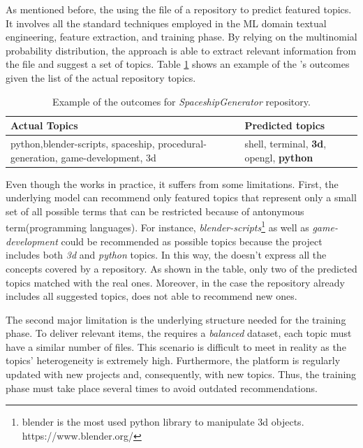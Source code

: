 As mentioned before, the \MNB using the \RM file of a repository to predict featured topics. It involves all the standard techniques employed in the ML domain \ie textual engineering, feature extraction, and training phase. By relying on the multinomial probability distribution, the approach is able to extract relevant information from the \RM file and suggest a set of topics. Table \ref{tab:example} shows an example of the \MNB's outcomes given the list of the actual repository topics. 

\begin{table}[h]
\centering

\resizebox{8.5cm}{!} {

\begin{tabular}{| p{3.2cm} | p{3.2cm} | }
\hline
 \textbf{Actual Topics} &\textbf{ Predicted topics} \\ \hline
     python,blender-scripts, spaceship, procedural-generation, game-development, 3d        &  
  shell, terminal, \textbf{3d},	opengl,	\textbf{python}        \\ \hline

\end{tabular}
}
\caption{Example of the \MNB outcomes for \emph{SpaceshipGenerator} repository.}
\label{tab:example}
\end{table} 


Even though the \MNB works in practice, it suffers from some limitations. First, the underlying model can recommend only featured topics that represent only a small set of all possible terms that can be restricted because of antonymous term(\eg programming languages). For instance, \emph{blender-scripts}\footnote{blender is the most used python library to manipulate 3d objects. \url{}https://www.blender.org/} as well as \emph{game-development} could be recommended as possible topics because the project includes both \emph{3d} and \emph{python} topics.
In this way, the \MNB doesn't express all the concepts covered by a \GH repository. As shown in the table, only two of the predicted topics matched with the real ones. Moreover, in the case the repository already includes all suggested topics, \MNB does not able to recommend new ones.

The second major limitation is the underlying structure needed for the training phase. To deliver relevant items, the \MNB requires a \emph{balanced} dataset, \ie each topic must have a similar number of  \RM files. This scenario is difficult to meet in reality as the topics' heterogeneity is extremely high. Furthermore, the \GH platform is regularly updated with new projects and, consequently, with new topics. Thus, the training phase must take place several times to avoid outdated recommendations. 